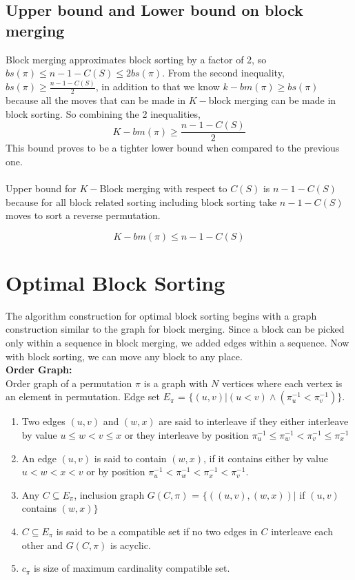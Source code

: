 \documentclass[BTech]{iitmdiss}
\begin{document}
\section{Upper bound and Lower bound on block merging}
Block merging approximates block sorting by a factor of 2, so $bs(\pi) \leq n-1-C(S) \leq 2bs(\pi)$. From the second inequality, $bs(\pi) \geq \frac{n-1-C(S)}{2}$, in addition to that we know $k-bm(\pi) \geq bs(\pi)$ because all the moves that can be made in $K-$block merging can be made in block sorting. So combining the 2 inequalities,
$$K-bm(\pi) \geq \frac{n-1-C(S)}{2}$$
This bound proves to be a tighter lower bound when compared to the previous one.\\~\\
Upper bound for $K-$Block merging with respect to $C(S)$ is $n-1-C(S)$ because for all block related sorting including block sorting take $n-1-C(S)$ moves to sort a reverse permutation.

$$K-bm(\pi) \leq n-1-C(S)$$



\chapter{Optimal Block Sorting}
The algorithm construction for optimal block sorting begins with a graph construction similar to the graph for block merging. Since a block can be picked only within a sequence in block merging, we added edges within a sequence. Now with block sorting, we can move any block to any place. \\
\textbf{Order Graph:}\\
Order graph of a permutation $\pi$ is a graph with $N$ vertices where each vertex is an element in permutation. Edge set $E_{\pi}$ = $\{ (u,v) | (u<v) \land (\pi_{u}^{-1} < \pi_{v}^{-1})\}$.\\
\begin{enumerate}
    \item Two edges $(u,v)$ and $(w,x)$ are said to interleave if they either interleave by value $u\leq w<v\leq x$  or they interleave by position $\pi_{u}^{-1}\leq \pi_{w}^{-1}<\pi_{v}^{-1}\leq \pi_{x}^{-1}$
    \item An edge $(u,v)$ is said to contain $(w,x)$, if it contains either by value $u<w<x<v$ or by position $\pi_{u}^{-1} < \pi_{w}^{-1} < \pi_{x}^{-1}< \pi_{v}^{-1}$. 
    \item Any $C\subseteq E_{\pi}$, inclusion graph $G(C,\pi)$ = $\{ ((u,v),(w,x)) |$ if $(u,v)$ contains $(w,x)\}$
    \item $C\subseteq E_{\pi}$ is said to be a compatible set if no two edges in $C$ interleave each other and $G(C,\pi)$ is acyclic.
    \item $c_{\pi}$ is size of maximum cardinality compatible set. 
\end{enumerate}
\end{document}
